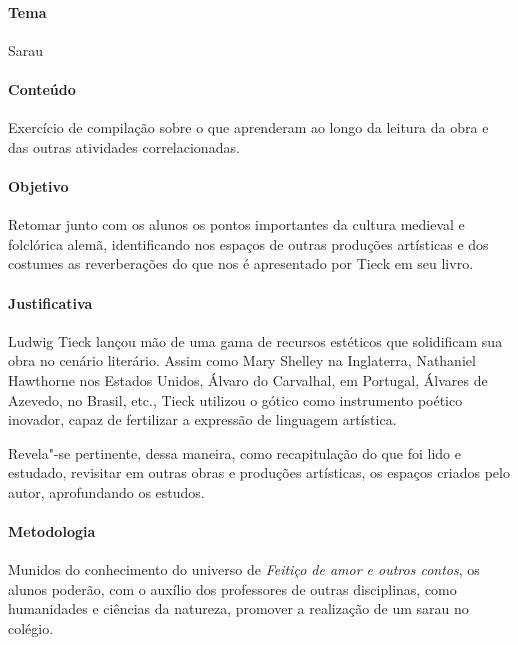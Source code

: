 \documentclass[12pt]{extarticle}
\begin{document}
\paragraph{Tema} Sarau 

\paragraph{Conteúdo} Exercício de compilação sobre o que aprenderam ao longo da leitura da obra e das outras 
atividades correlacionadas. 

\paragraph{Objetivo} Retomar junto com os alunos os pontos importantes da cultura medieval e folclórica alemã, identificando 
nos espaços de outras produções artísticas e dos costumes as reverberações do que nos 
é apresentado por Tieck em seu livro. 

\paragraph{Justificativa} Ludwig Tieck lançou mão de uma gama de recursos estéticos que
solidificam sua obra no cenário literário. Assim como Mary Shelley na
Inglaterra, Nathaniel Hawthorne nos Estados Unidos, Álvaro do Carvalhal,
em Portugal, Álvares de Azevedo, no Brasil, etc., Tieck utilizou o
gótico como instrumento poético inovador, capaz de fertilizar a
expressão de linguagem artística.

Revela"-se pertinente, dessa maneira, como recapitulação do que foi lido e estudado, revisitar em outras 
obras e produções artísticas, os espaços criados pelo autor, aprofundando os estudos.

\paragraph{Metodologia}
Munidos do conhecimento do universo de \emph{Feitiço de amor e outros contos}, os alunos
poderão, com o auxílio dos professores de outras disciplinas, como humanidades e ciências da natureza, 
promover a realização de um sarau no colégio. 
\end{document}
